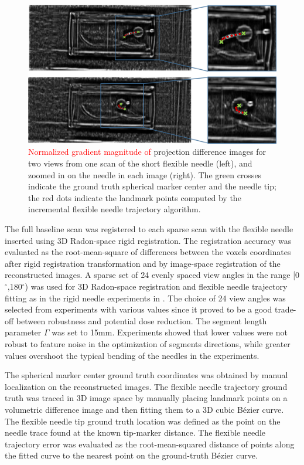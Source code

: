 \begin{figure}[t]
\centering
\includegraphics[width=\textwidth]{projection_diff_images.png}
\caption{\textcolor{red}{Normalized gradient magnitude of} projection difference images for two views from one scan of the short flexible needle (left), and zoomed in on the needle in each image (right). The green crosses indicate the ground truth spherical marker center and the needle tip; the red dots indicate the landmark points computed by the incremental flexible needle trajectory algorithm.}
\label{proj_diff_fig}
\end{figure}

The full baseline scan was registered to each sparse scan with the flexible needle inserted using 3D Radon-space rigid registration. The registration accuracy was evaluated as the root-mean-square of differences between the voxels coordinates after rigid registration transformation and by image-space registration of the reconstructed images. A sparse set of 24 evenly spaced view angles in the range [0$^\circ$,180$^\circ$) was used for 3D Radon-space registration and flexible needle trajectory fitting as in the rigid needle experiments in \cite{medan2017reduced}. The choice of 24 view angles was selected from experiments with various values since it proved to be a good trade-off between robustness and potential dose reduction. The segment length parameter $\Gamma$ was set to 15mm. Experiments showed that lower values were not robust to feature noise in the optimization of segments directions, while greater values overshoot the typical bending of the needles in the experiments.

The spherical marker center ground truth coordinates was obtained by manual localization on the reconstructed images. The flexible needle trajectory ground truth was traced in 3D image space by manually placing landmark points on a volumetric difference image and then fitting them to a 3D cubic B\'ezier curve. The flexible needle tip ground truth location was defined as the point on the needle trace found at the known tip-marker distance. The flexible needle trajectory error was evaluated as the root-mean-squared distance of points along the fitted curve to the nearest point on the ground-truth B\'ezier curve.

